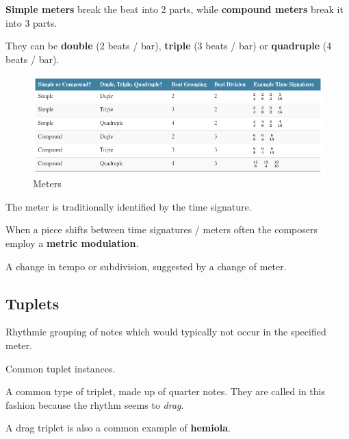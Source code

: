 \textbf{Simple meters} break the beat into 2 parts, while \textbf{compound meters} break it into 3 parts.

They can be \textbf{double} (2 beats / bar), \textbf{triple} (3 beats / bar) or \textbf{quadruple} (4 beats / bar).

\begin{figure}[h]
    \begin{center}
        \includegraphics[width=1\textwidth]{img/meters}
        \caption{Meters}
    \end{center}
\end{figure}

The meter is traditionally identified by the time signature.

When a piece shifts between time signatures / meters often the composers employ a \textbf{metric modulation}.

\begin{definition}
    A change in tempo or subdivision, suggested by a change of meter.
\end{definition}

\subsection{Tuplets}
\begin{definition}[Tuplet]
    Rhythmic grouping of notes which would typically not occur in the specified meter.
\end{definition}

\begin{definition}
    Common tuplet instances.
\end{definition}

\begin{definition}
    A common type of triplet, made up of quarter notes. They are called in this fashion because the rhythm seems to \emph{drag}.
\end{definition}

A drag triplet is also a common example of \textbf{hemiola}.

